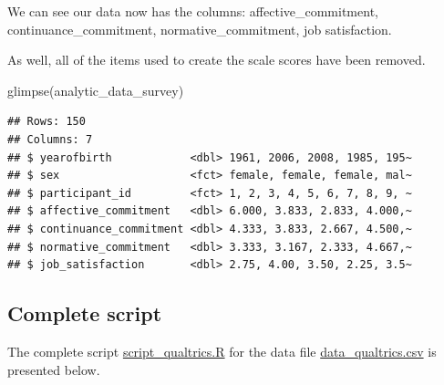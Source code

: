 \documentclass[
]{krantz}
\makeatletter
\newenvironment{Shaded}{\begin{snugshade}}{\end{snugshade}}
\newcommand{\FunctionTok}[1]{\textcolor[rgb]{0,0,0}{#1}}
\newcommand{\NormalTok}[1]{#1}
\newenvironment{kframe}{%
\medskip{}
\setlength{\fboxsep}{.8em}
 \def\at@end@of@kframe{}%
 \ifinner\ifhmode%
  \def\at@end@of@kframe{\end{minipage}}%
  \begin{minipage}{\columnwidth}%
 \fi\fi%
 \def\FrameCommand##1{\hskip\@totalleftmargin \hskip-\fboxsep
 \colorbox{shadecolor}{##1}\hskip-\fboxsep
     \hskip-\linewidth \hskip-\@totalleftmargin \hskip\columnwidth}%
 \MakeFramed {\advance\hsize-\width
   \@totalleftmargin\z@ \linewidth\hsize
   \@setminipage}}%
 {\par\unskip\endMakeFramed%
 \at@end@of@kframe}
\renewenvironment{Shaded}{\begin{kframe}}{\end{kframe}}
\makeatother
\begin{document}
We can see our data now has the columns: affective\_commitment, continuance\_commitment, normative\_commitment, job satisfaction.

As well, all of the items used to create the scale scores have been removed.

\begin{Shaded}
\begin{Highlighting}[]
\FunctionTok{glimpse}\NormalTok{(analytic\_data\_survey)}
\end{Highlighting}
\end{Shaded}

\begin{verbatim}
## Rows: 150
## Columns: 7
## $ yearofbirth            <dbl> 1961, 2006, 2008, 1985, 195~
## $ sex                    <fct> female, female, female, mal~
## $ participant_id         <fct> 1, 2, 3, 4, 5, 6, 7, 8, 9, ~
## $ affective_commitment   <dbl> 6.000, 3.833, 2.833, 4.000,~
## $ continuance_commitment <dbl> 4.333, 3.833, 2.667, 4.500,~
## $ normative_commitment   <dbl> 3.333, 3.167, 2.333, 4.667,~
## $ job_satisfaction       <dbl> 2.75, 4.00, 3.50, 2.25, 3.5~
\end{verbatim}

\hypertarget{complete-script}{%
\subsection{Complete script}\label{complete-script}}

The complete script \url{script_qualtrics.R} for the data file \url{data_qualtrics.csv} is presented below.
\end{document}
